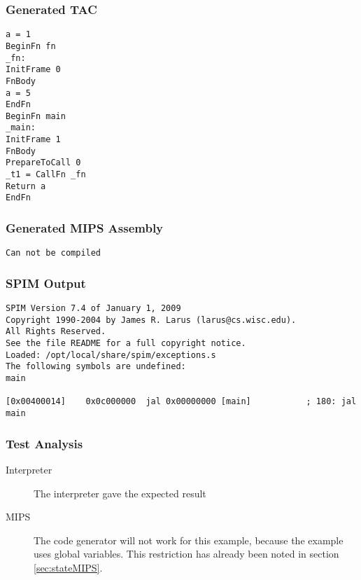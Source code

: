 \subsubsection{Generated TAC}
\begin{lstlisting}[showstringspaces=false,breaklines=true,backgroundcolor=\color{light-gray}, captionpos=b]
a = 1
BeginFn fn
_fn:
InitFrame 0
FnBody
a = 5
EndFn
BeginFn main
_main:
InitFrame 1
FnBody
PrepareToCall 0
_t1 = CallFn _fn
Return a
EndFn

\end{lstlisting}\subsubsection{Generated MIPS Assembly}
\begin{lstlisting}[showstringspaces=false,breaklines=true,backgroundcolor=\color{light-gray}, captionpos=b]
Can not be compiled
\end{lstlisting}\subsubsection{SPIM Output}
\begin{verbatim}
SPIM Version 7.4 of January 1, 2009
Copyright 1990-2004 by James R. Larus (larus@cs.wisc.edu).
All Rights Reserved.
See the file README for a full copyright notice.
Loaded: /opt/local/share/spim/exceptions.s
The following symbols are undefined:
main

[0x00400014]	0x0c000000  jal 0x00000000 [main]           ; 180: jal main
\end{verbatim}
\subsubsection{Test Analysis}
\begin{description}
	\item[Interpreter] The interpreter gave the expected result
	\item[MIPS] The code generator will not work for this example, because the example uses global variables. This restriction has already been noted in section \ref{sec:stateMIPS}.
\end{description}